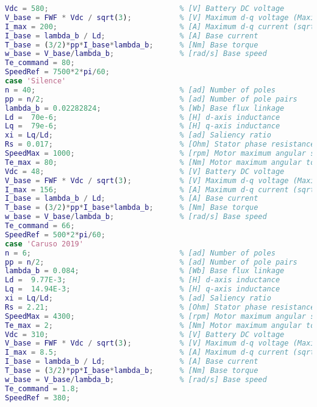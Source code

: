 \begin{lstlisting}[language=Matlab, basicstyle=\ttfamily\small, breaklines=true, frame=single]
Vdc = 580;                              % [V] Battery DC voltage
V_base = FWF * Vdc / sqrt(3);           % [V] Maximum d-q voltage (Maximum Torque per Voltage Flux-Weakening strategy with speed limiter for PMSM drives, 2020)
I_max = 200;                            % [A] Maximum d-q current (sqrt(i_d^2+i_q^2))
I_base = lambda_b / Ld;                 % [A] Base current
T_base = (3/2)*pp*I_base*lambda_b;      % [Nm] Base torque
w_base = V_base/lambda_b;               % [rad/s] Base speed
Te_command = 80;
SpeedRef = 7500*2*pi/60;  
case 'Silence'
n = 40;                                 % [ad] Number of poles 
pp = n/2;                               % [ad] Number of pole pairs
lambda_b = 0.02282824;                  % [Wb] Base flux linkage
Ld =  70e-6;                            % [H] d-axis inductance
Lq =  79e-6;                            % [H] q-axis inductance
xi = Lq/Ld;                             % [ad] Saliency ratio
Rs = 0.017;                             % [Ohm] Stator phase resistance (phase-to-phase/2)
SpeedMax = 1000;                        % [rpm] Motor maximum angular speed
Te_max = 80;                            % [Nm] Motor maximum angular torque
Vdc = 48;                               % [V] Battery DC voltage
V_base = FWF * Vdc / sqrt(3);           % [V] Maximum d-q voltage (Maximum Torque per Voltage Flux-Weakening strategy with speed limiter for PMSM drives, 2020)
I_max = 156;                            % [A] Maximum d-q current (sqrt(i_d^2+i_q^2))      
I_base = lambda_b / Ld;                 % [A] Base current
T_base = (3/2)*pp*I_base*lambda_b;      % [Nm] Base torque
w_base = V_base/lambda_b;               % [rad/s] Base speed
Te_command = 66;
SpeedRef = 500*2*pi/60;
case 'Caruso 2019'
n = 6;                                  % [ad] Number of poles 
pp = n/2;                               % [ad] Number of pole pairs
lambda_b = 0.084;                       % [Wb] Base flux linkage
Ld =  9.77E-3;                          % [H] d-axis inductance
Lq =  14.94E-3;                         % [H] q-axis inductance
xi = Lq/Ld;                             % [ad] Saliency ratio
Rs = 2.21;                              % [Ohm] Stator phase resistance (phase-to-phase/2)
SpeedMax = 4300;                        % [rpm] Motor maximum angular speed
Te_max = 2;                             % [Nm] Motor maximum angular torque
Vdc = 310;                              % [V] Battery DC voltage
V_base = FWF * Vdc / sqrt(3);           % [V] Maximum d-q voltage (Maximum Torque per Voltage Flux-Weakening strategy with speed limiter for PMSM drives, 2020)
I_max = 8.5;                            % [A] Maximum d-q current (sqrt(i_d^2+i_q^2))
I_base = lambda_b / Ld;                 % [A] Base current
T_base = (3/2)*pp*I_base*lambda_b;      % [Nm] Base torque
w_base = V_base/lambda_b;               % [rad/s] Base speed
Te_command = 1.8;
SpeedRef = 380;


\end{lstlisting}
